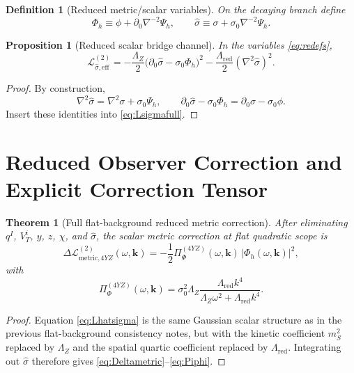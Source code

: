 \documentclass[11pt]{article}
\newtheorem{definition}{Definition}
\newtheorem{proposition}{Proposition}
\newtheorem{theorem}{Theorem}
\begin{document}
\begin{definition}[Reduced metric/scalar variables]
\label{def:redefs}
On the decaying branch define
\begin{equation}
\Phi_h
\equiv
\phi+\partial_0\nabla^{-2}\Psi_h,
\qquad
\hat\sigma
\equiv
\sigma+\sigma_0\nabla^{-2}\Psi_h.
\label{eq:redefs}
\end{equation}
\end{definition}

\begin{proposition}[Reduced scalar bridge channel]
\label{prop:hatsigma}
In the variables \eqref{eq:redefs},
\begin{equation}
\mathcal L_{\hat\sigma,\mathrm{eff}}^{(2)}
=
-\frac{\Lambda_Z}{2}\bigl(\partial_0\hat\sigma-\sigma_0\Phi_h\bigr)^2
-\frac{\Lambda_{\mathrm{red}}}{2}(\nabla^2\hat\sigma)^2.
\label{eq:Lhatsigma}
\end{equation}
\end{proposition}

\begin{proof}
By construction,
\[
\nabla^2\hat\sigma=\nabla^2\sigma+\sigma_0\Psi_h,
\qquad
\partial_0\hat\sigma-\sigma_0\Phi_h=\partial_0\sigma-\sigma_0\phi.
\]
Insert these identities into \eqref{eq:Lsigmafull}.
\end{proof}

\section{Reduced Observer Correction and Explicit Correction Tensor}

\begin{theorem}[Full flat-background reduced metric correction]
\label{thm:metriccorr}
After eliminating \(q^I\), \(V_T^i\), \(y\), \(z\), \(\chi\), and \(\hat\sigma\), the scalar metric correction at flat quadratic scope is
\begin{equation}
\Delta\mathcal L_{\mathrm{metric},4YZ}^{(2)}(\omega,\mathbf{k})
=
-\frac12\Pi_{\Phi}^{(4YZ)}(\omega,\mathbf{k})\,|\Phi_h(\omega,\mathbf{k})|^2,
\label{eq:Deltametric}
\end{equation}
with
\begin{equation}
\Pi_{\Phi}^{(4YZ)}(\omega,\mathbf{k})
=
\sigma_0^2\Lambda_Z
\frac{\Lambda_{\mathrm{red}}k^4}
{\Lambda_Z\omega^2+\Lambda_{\mathrm{red}}k^4}.
\label{eq:Piphi}
\end{equation}
\end{theorem}

\begin{proof}
Equation \eqref{eq:Lhatsigma} is the same Gaussian scalar structure as in the previous flat-background consistency notes, but with the kinetic coefficient \(m_S^2\) replaced by \(\Lambda_Z\) and the spatial quartic coefficient replaced by \(\Lambda_{\mathrm{red}}\). Integrating out \(\hat\sigma\) therefore gives \eqref{eq:Deltametric}--\eqref{eq:Piphi}.
\end{proof}
\end{document}
